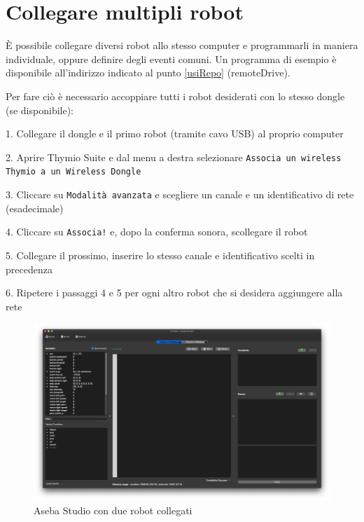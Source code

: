 \documentclass[12pt]{article}
\begin{document}
	\newpage
	
		
\section{Collegare multipli robot}\label{multi-robot}

	È possibile collegare diversi robot allo stesso computer e programmarli in maniera individuale, oppure definire degli eventi comuni. Un programma di esempio è disponibile all'indirizzo indicato al punto \ref{usiRepo} (remoteDrive).
	
	Per fare ciò è necessario accoppiare tutti i robot desiderati con lo stesso dongle (se disponibile):
	
	1. Collegare il dongle e il primo robot (tramite cavo USB) al proprio computer
	
	2. Aprire Thymio Suite e dal menu a destra selezionare \texttt{Associa un wireless Thymio a un Wireless Dongle}
	
	3. Cliccare su \texttt{Modalità avanzata} e scegliere un canale e un identificativo di rete (esadecimale)
	
	4. Cliccare su \texttt{Associa!} e, dopo la conferma sonora, scollegare il robot
	
	5. Collegare il prossimo, inserire lo stesso canale e identificativo scelti in precedenza
	
	6. Ripetere i passaggi 4 e 5 per ogni altro robot che si desidera aggiungere alla rete
	
	
	\begin{figure}[H]
		\includegraphics[width=\textwidth]{img/multiRobot.png}
		\caption{Aseba Studio con due robot collegati}
		\label{multiRobot}
	\end{figure}
	
	\newpage
	
\end{document}
